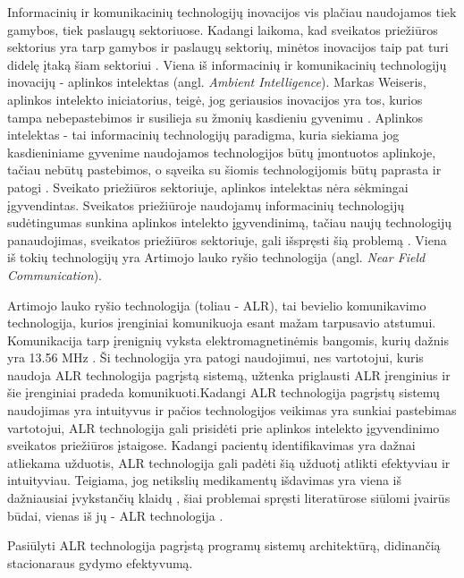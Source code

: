 Informacinių ir komunikacinių technologijų inovacijos vis plačiau naudojamos tiek gamybos, tiek paslaugų sektoriuose. Kadangi laikoma, kad sveikatos priežiūros sektorius yra tarp gamybos ir paslaugų sektorių, minėtos inovacijos taip pat turi didelę įtaką šiam sektoriui \cite{Puma2012}. Viena iš informacinių ir komunikacinių technologijų inovacijų - aplinkos intelektas (angl. \textit{Ambient Intelligence}). Markas Weiseris, aplinkos intelekto iniciatorius, teigė, jog geriausios inovacijos yra tos, kurios tampa nebepastebimos ir susilieja su žmonių kasdieniu gyvenimu \cite{Cook2009}. Aplinkos intelektas - tai informacinių technologijų paradigma, kuria siekiama jog kasdieniniame gyvenime naudojamos technologijos būtų įmontuotos aplinkoje, tačiau nebūtų pastebimos, o sąveika su šiomis technologijomis būtų paprasta ir patogi \cite{Bravo2008}. Sveikato priežiūros sektoriuje, aplinkos intelektas nėra sėkmingai įgyvendintas. Sveikatos priežiūroje naudojamų informacinių technologijų sudėtingumas sunkina aplinkos intelekto įgyvendinimą, tačiau naujų technologijų panaudojimas, sveikatos priežiūros sektoriuje, gali išspręsti šią problemą \cite{Fontecha2011}. Viena iš tokių technologijų yra Artimojo lauko ryšio technologija (angl. \textit{Near Field Communication}). 

Artimojo lauko ryšio technologija (toliau - ALR), tai bevielio komunikavimo technologija, kurios įrenginiai komunikuoja esant mažam tarpusavio atstumui. Komunikacija tarp įrenignių vyksta elektromagnetinėmis bangomis, kurių dažnis yra 13.56 MHz \cite{Leora1980}. Ši technologija yra patogi naudojimui, nes vartotojui, kuris naudoja ALR technologija pagrįstą sistemą, užtenka priglausti ALR įrenginius ir šie įrenginiai pradeda komunikuoti.Kadangi ALR technologija pagrįstų sistemų naudojimas yra intuityvus ir pačios technologijos veikimas yra sunkiai pastebimas vartotojui, ALR technologija gali prisidėti prie aplinkos intelekto įgyvendinimo sveikatos priežiūros įstaigose. Kadangi pacientų identifikavimas yra dažnai atliekama užduotis, ALR technologija gali padėti šią užduotį atlikti efektyviau ir intuityviau. Teigiama, jog netikslių medikamentų išdavimas yra viena iš dažniausiai įvykstančių klaidų \cite{Agrawal2009}, šiai problemai spręsti literatūrose siūlomi įvairūs būdai, vienas iš jų - ALR technologija \cite{Gautam}.



Pasiūlyti ALR technologija pagrįstą programų sistemų architektūrą, didinančią stacionaraus gydymo efektyvumą.
    
